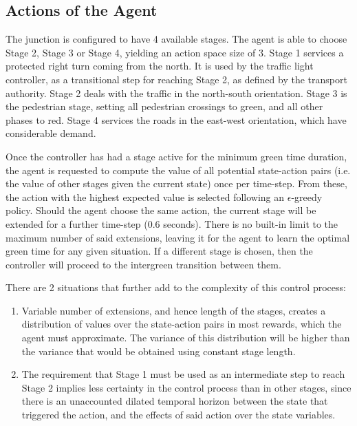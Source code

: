 \documentclass[a4paper, conference]{IEEEtran}
\begin{document}
\subsection{Actions of the Agent}
The junction is configured to have 4 available stages. 
The agent is able to choose Stage 2, Stage 3 or Stage 4, yielding an action space size of 3.
Stage 1 services a protected right turn coming from the north. It is used by the traffic light controller, as a transitional step for reaching Stage 2, as defined by the transport authority.
Stage 2 deals with the traffic in the north-south orientation.
Stage 3 is the pedestrian stage, setting all pedestrian crossings to green, and all other phases to red.
Stage 4 services the roads in the east-west orientation, which have considerable demand.

Once the controller has had a stage active for the minimum green time duration, the agent is requested to compute the value of all potential state-action pairs (i.e. the value of other stages given the current state) once per time-step.
From these, the action with the highest expected value is selected following an $\epsilon$-greedy policy\cite{suttonbarto}.
Should the agent choose the same action, the current stage will be extended for a further time-step (0.6 seconds).
There is no built-in limit to the maximum number of said extensions, leaving it for the agent to learn the optimal green time for any given situation.
If a different stage is chosen, then the controller will proceed to the intergreen transition between them.

There are 2 situations that further add to the complexity of this control process:
\begin{enumerate}
\item Variable number of extensions, and hence length of the stages, creates a distribution of values over the state-action pairs in most rewards, which the agent must approximate. The variance of this distribution will be higher than the variance that would be obtained using constant stage length.
\item The requirement that Stage 1 must be used as an intermediate step to reach Stage 2 implies less certainty in the control process than in other stages, since there is an unaccounted dilated temporal horizon between the state that triggered the action, and the effects of said action over the state variables.
\end{enumerate}
\end{document}
